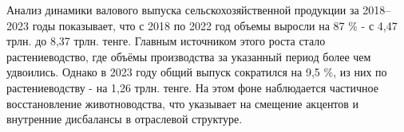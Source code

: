 
Анализ динамики валового выпуска сельскохозяйственной продукции за
2018--2023 годы показывает, что с 2018 по 2022 год объемы выросли на 87
\% - с 4,47 трлн. до 8,37 трлн. тенге. Главным источником этого роста
стало растениеводство, где объёмы производства за указанный период более
чем удвоились. Однако в 2023 году общий выпуск сократился на 9,5 \%, из
них по растениеводству - на 1,26 трлн. тенге. На этом фоне наблюдается
частичное восстановление животноводства, что указывает на смещение
акцентов и внутренние дисбалансы в отраслевой структуре.

